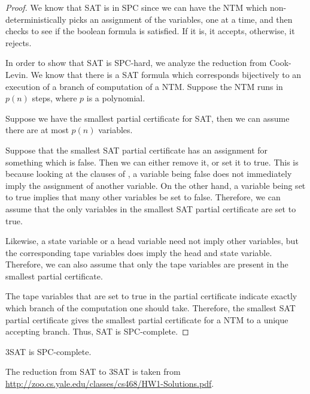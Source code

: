 \documentclass[runningheads,a4paper]{llncs}
\begin{document}
\begin{proof}
We know that SAT is in SPC since we can have the NTM which non-deterministically picks an assignment of the variables, one at a time, and then checks to see if the boolean formula is satisfied. If it is, it accepts, otherwise, it rejects. 

In order to show that SAT is SPC-hard, we analyze the reduction from Cook-Levin. We know that there is a SAT formula which corresponds bijectively to an execution of a branch of computation of a NTM. Suppose the NTM runs in $p(n)$ steps, where $p$ is a polynomial.

Suppose we have the smallest partial certificate for SAT, then we can assume there are at most $p(n)$ variables. 

Suppose that the smallest SAT partial certificate has an assignment for something which is false. Then we can either remove it, or set it to true. This is because looking at the clauses of \cite{Garey}, a variable being false does not immediately imply the assignment of another variable. On the other hand, a variable being set to true implies that many other variables be set to false. Therefore, we can assume that the only variables in the smallest SAT partial certificate are set to true.

Likewise, a state variable or a head variable need not imply other variables, but the corresponding tape variables does imply the head and state variable. Therefore, we can also assume that only the tape variables are present in the smallest partial certificate.

The tape variables that are set to true in the partial certificate indicate exactly which branch of the computation one should take. Therefore, the smallest SAT partial certificate gives the smallest partial certificate for a NTM to a unique accepting branch. Thus, SAT is SPC-complete.
\end{proof}

\begin{theorem}
3SAT is SPC-complete.
\end{theorem}

The reduction from SAT to 3SAT is taken from \url{http://zoo.cs.yale.edu/classes/cs468/HW1-Solutions.pdf}.
\end{document}
